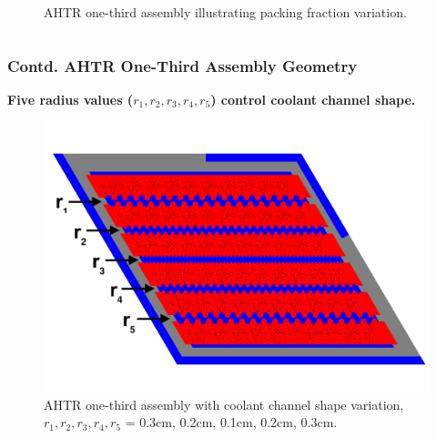 \begin{frame}
\begin{columns}[t]
\begin{column}{0.5\textwidth}
\begin{figure}
{            \caption{AHTR one-third assembly illustrating packing fraction variation.}}
        \end{figure}
        \end{column}
        \begin{column}{0.5\textwidth} 
        \end{column}
        \end{columns}
\end{frame}

\begin{frame}
    \frametitle{Contd. AHTR One-Third Assembly Geometry}
    \textbf{Five radius values (\textbf{$r_1, r_2, r_3, r_4, r_5$}) 
    control coolant channel shape.}
    \begin{figure}
        \includegraphics[width=0.7\linewidth]{../docs/figures/coolant-channel-shape-assem.png} 
        \caption{AHTR one-third assembly with coolant channel shape variation, 
        $r_1, r_2, r_3, r_4, r_5$ = 0.3cm, 0.2cm, 0.1cm, 0.2cm, 0.3cm.}
    \end{figure}
\end{frame}

